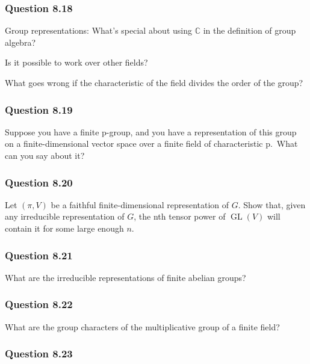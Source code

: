 \hypertarget{question-8.18}{%
\subsubsection{Question 8.18}\label{question-8.18}}

Group representations: What's special about using \({\mathbb{C}}\) in
the definition of group algebra?

Is it possible to work over other fields?

What goes wrong if the characteristic of the field divides the order of
the group?

\hypertarget{question-8.19}{%
\subsubsection{Question 8.19}\label{question-8.19}}

Suppose you have a finite p-group, and you have a representation of this
group on a finite-dimensional vector space over a finite field of
characteristic p.~What can you say about it?

\hypertarget{question-8.20}{%
\subsubsection{Question 8.20}\label{question-8.20}}

Let \((\pi, V)\) be a faithful finite-dimensional representation of
\(G\). Show that, given any irreducible representation of \(G\), the nth
tensor power of \(\operatorname{GL}(V)\) will contain it for some large
enough \(n\).

\hypertarget{question-8.21}{%
\subsubsection{Question 8.21}\label{question-8.21}}

What are the irreducible representations of finite abelian groups?

\hypertarget{question-8.22}{%
\subsubsection{Question 8.22}\label{question-8.22}}

What are the group characters of the multiplicative group of a finite
field?

\hypertarget{question-8.23}{%
\subsubsection{Question 8.23}\label{question-8.23}}

